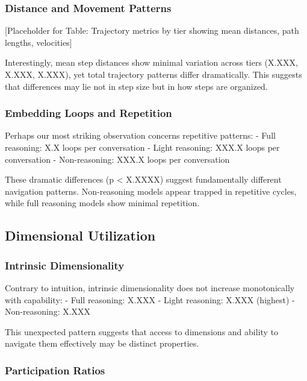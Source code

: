 \documentclass[11pt,letterpaper]{article}
\newcommand{\fullMeanDistance}{X.XXX}
\newcommand{\lightMeanDistance}{X.XXX}
\newcommand{\nonMeanDistance}{X.XXX}
\newcommand{\fullIntrinsicDim}{X.XXX}
\newcommand{\lightIntrinsicDim}{X.XXX}
\newcommand{\nonIntrinsicDim}{X.XXX}
\newcommand{\fullLoops}{X.X}
\newcommand{\lightLoops}{XXX.X}
\newcommand{\nonLoops}{XXX.X}
\newcommand{\pValueEmbeddingLoops}{X.XXXX}
\begin{document}
\subsubsection{Distance and Movement Patterns}

[Placeholder for Table: Trajectory metrics by tier showing mean distances, path lengths, velocities]

Interestingly, mean step distances show minimal variation across tiers (\fullMeanDistance{}, \lightMeanDistance{}, \nonMeanDistance{}), yet total trajectory patterns differ dramatically. This suggests that differences may lie not in step size but in how steps are organized.

\subsubsection{Embedding Loops and Repetition}

Perhaps our most striking observation concerns repetitive patterns:
- Full reasoning: \fullLoops{} loops per conversation
- Light reasoning: \lightLoops{} loops per conversation  
- Non-reasoning: \nonLoops{} loops per conversation

These dramatic differences (p < \pValueEmbeddingLoops{}) suggest fundamentally different navigation patterns. Non-reasoning models appear trapped in repetitive cycles, while full reasoning models show minimal repetition.

\subsection{Dimensional Utilization}

\subsubsection{Intrinsic Dimensionality}

Contrary to intuition, intrinsic dimensionality does not increase monotonically with capability:
- Full reasoning: \fullIntrinsicDim{}
- Light reasoning: \lightIntrinsicDim{} (highest)
- Non-reasoning: \nonIntrinsicDim{}

This unexpected pattern suggests that access to dimensions and ability to navigate them effectively may be distinct properties.

\subsubsection{Participation Ratios}
\end{document}
